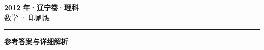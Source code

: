 \documentclass[zihao=5, a4paper]{ctexart}
\begin{document}
\begin{center}
  {\Large\bfseries 2012 年·辽宁卷·理科}\\[4pt]
  {\large 数学 · 印刷版}
\end{center}
\medskip
{}

\par\bigskip\hrule\bigskip
{}
\Needspace{0.55\textheight}
\begin{center}{\large\bfseries 参考答案与详细解析}\end{center}
\smallskip

\end{document}
